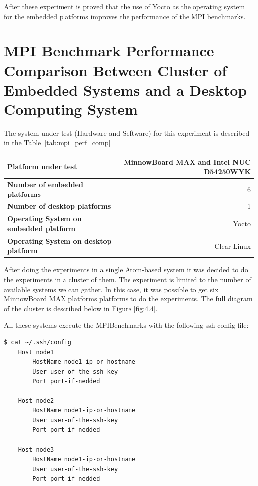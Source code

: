 After these experiment is proved that the use of Yocto as the operating system
for the embedded platforms improves the performance of the MPI benchmarks. 

\section{MPI Benchmark Performance Comparison Between Cluster of Embedded
Systems and a Desktop Computing System}

The system under test (Hardware and Software) for this experiment is described
in the Table~\ref{tab:mpi_perf_comp}
    
    \begin{center}
    \begin{tabular}{ | l | r |}
        \hline
        \textbf{Platform under test} &  MinnowBoard MAX  and Intel NUC D54250WYK\\ \hline
        \textbf{Number of embedded platforms}  & 6  \\ \hline
        \textbf{Number of desktop platforms}  & 1  \\ \hline
        \textbf{Operating System on embedded platform} & Yocto  \\ \hline
        \textbf{Operating System on desktop platform} & Clear Linux  \\ \hline
    \end{tabular}
    \label{tab:mpi_perf_comp}
    \end{center}

After doing the experiments in a single Atom-based system it was  decided to do the
experiments in a cluster of them. The experiment is limited to the number of
available systems we can gather. In this case, it was possible to get six  MinnowBoard MAX
platforms \cite{minnowboard} platforms to do the experiments. The full diagram
of the cluster is described below in Figure \ref{fig:4.4}.

All these systems execute the MPIBenchmarks with the following ssh config file:

\begin{minipage}{\textwidth}
\end{minipage}

\begin{minipage}{\textwidth}

\begin{lstlisting}[frame=single]
  $ cat ~/.ssh/config
    Host node1
        HostName node1-ip-or-hostname
        User user-of-the-ssh-key
        Port port-if-nedded

    Host node2
        HostName node1-ip-or-hostname
        User user-of-the-ssh-key
        Port port-if-nedded

    Host node3
        HostName node1-ip-or-hostname
        User user-of-the-ssh-key
        Port port-if-nedded

\end{lstlisting}

\end{minipage}

